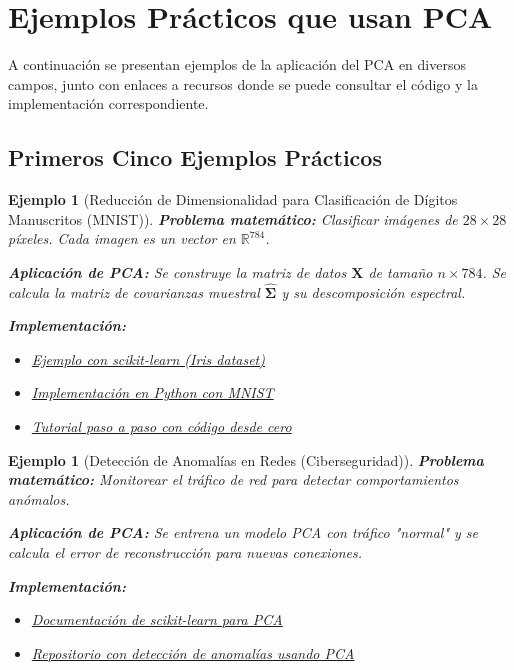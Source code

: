 \documentclass[11pt]{article}
\theoremstyle{plain}
\newtheorem{example}[theorem]{Ejemplo}
\newcommand{\bfSigma}{\boldsymbol{\Sigma}}
\begin{document}
\section{Ejemplos Prácticos que usan PCA}

A continuación se presentan ejemplos de la aplicación del PCA en diversos campos, junto con enlaces a recursos donde se puede consultar el código y la implementación correspondiente.

\subsection{Primeros Cinco Ejemplos Prácticos}

\begin{example}[Reducción de Dimensionalidad para Clasificación de Dígitos Manuscritos (MNIST)]
\label{ej:mnist}
\textbf{Problema matemático:} Clasificar imágenes de \(28 \times 28\) píxeles. Cada imagen es un vector en \(\mathbb{R}^{784}\).

\textbf{Aplicación de PCA:} Se construye la matriz de datos \(\mathbf{X}\) de tamaño \(n \times 784\). Se calcula la matriz de covarianzas muestral \(\hat{\bfSigma}\) y su descomposición espectral.

\textbf{Implementación:} 
\begin{itemize}
    \item \href{https://scikit-learn.org/stable/auto_examples/decomposition/plot_pca_iris.html}{Ejemplo con scikit-learn (Iris dataset)} 
    \item \href{https://github.com/mazieres/analysis/blob/master/mnist_pca.py}{Implementación en Python con MNIST}
    \item \href{https://medium.com/data-science/principal-component-analysis-made-easy-a-step-by-step-tutorial-184f295e97fe}{Tutorial paso a paso con código desde cero} 
\end{itemize}
\end{example}

\begin{example}[Detección de Anomalías en Redes (Ciberseguridad)]
\label{ej:anomalias}
\textbf{Problema matemático:} Monitorear el tráfico de red para detectar comportamientos anómalos.

\textbf{Aplicación de PCA:} Se entrena un modelo PCA con tráfico "normal" y se calcula el error de reconstrucción para nuevas conexiones.

\textbf{Implementación:}
\begin{itemize}
    \item \href{https://scikit-learn.org/stable/modules/generated/sklearn.decomposition.PCA.html}{Documentación de scikit-learn para PCA}
    \item \href{https://github.com/elena-sharova/AnomalyDetectionPCA}{Repositorio con detección de anomalías usando PCA}
\end{itemize}
\end{example}
\end{document}
